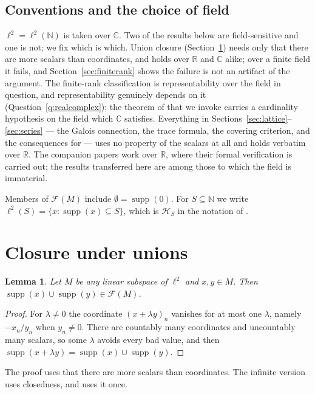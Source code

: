 \documentclass[11pt,reqno]{amsart}
\newtheorem{lemma}[theorem]{Lemma}
\theoremstyle{definition}
\DeclareMathOperator{\supp}{supp}
\newcommand{\N}{\mathbb{N}}
\newcommand{\C}{\mathbb{C}}
\newcommand{\R}{\mathbb{R}}
\newcommand{\F}{\mathcal{F}}
\newcommand{\HH}{\mathcal{H}}
\begin{document}
\subsection*{Conventions and the choice of field}
$\ell^2=\ell^2(\N)$ is taken over $\C$. Two of the results below are
field-sensitive and one is not; we fix which is which.
Union closure (Section~\ref{sec:unions}) needs only that there are more scalars
than coordinates, and holds over $\R$ and $\C$ alike; over a finite field it
fails, and Section~\ref{sec:finiterank} shows the failure is not an artifact of
the argument. The finite-rank classification is representability over the field
in question, and representability genuinely depends on it
(Question~\ref{q:realcomplex}); the theorem of \cite{ABFGGV} that we invoke
carries a cardinality hypothesis on the field which $\C$ satisfies. Everything
in Sections~\ref{sec:lattice}--\ref{sec:series} --- the Galois connection, the
trace formula, the covering criterion, and the consequences for
\cite{FWII} --- uses no property of the scalars at all and holds verbatim over
$\R$. The companion papers work over $\R$, where their formal verification is
carried out; the results transferred here are among those to which the field is
immaterial.

Members of $\F(M)$ include $\emptyset=\supp(0)$. For $S\subseteq\N$ we write
$\ell^2(S)=\{x:\supp(x)\subseteq S\}$, which is $\HH_S$ in the notation of
\cite{FWII}.

\section{Closure under unions}\label{sec:unions}

\begin{lemma}\label{lem:finiteunion}
Let $M$ be any linear subspace of $\ell^2$ and $x,y\in M$. Then
$\supp(x)\cup\supp(y)\in\F(M)$.
\end{lemma}

\begin{proof}
For $\lambda\neq0$ the coordinate $(x+\lambda y)_n$ vanishes for at most one
$\lambda$, namely $-x_n/y_n$ when $y_n\neq0$. There are countably many
coordinates and uncountably many scalars, so some $\lambda$ avoids every bad
value, and then $\supp(x+\lambda y)=\supp(x)\cup\supp(y)$.
\end{proof}

The proof uses that there are more scalars than coordinates. The infinite
version uses closedness, and uses it once.
\end{document}
